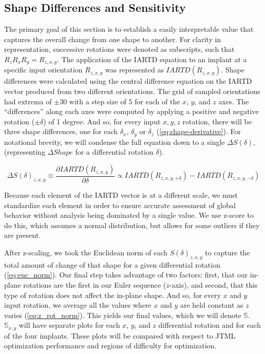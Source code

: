 \subsection{Shape Differences and Sensitivity}
The primary goal of this section is to establish a easily interpretable value that captures the overall change from one shape to another.
For clarity in representation, successive rotations were denoted as subscripts, such that $R_{z}R_{x}R_{y} = R_{z,x,y}$. The application of the IARTD equation to an implant at a specific input orientation $R_{z,x,y}$ was represented as $IARTD(R_{z,x,y})$.
Shape differences were calculated using the central difference equation on the IARTD vector produced from two different orientations.
The grid of sampled orientations had extrema of $\pm 30$ with a step size of $5$ for each of the $x$, $y$, and $z$ axes.
The ``differences'' along each axes were computed by applying a positive and negative rotation ($\pm \delta $) of 1 degree.
And so, for every input $x,y,z$ rotation, there will be three shape differences, one for each $\delta_{x}$, $\delta_{y}$ or $\delta_{z}$ (\cref{eq:shape-derivative}).
For notational brevity, we will condense the full equation down to a single $\Delta S(\delta)$, (representing $\Delta Shape$ for a differential rotation $\delta$).

\begin{equation}
	\label{eq:shape-derivative}
	\Delta S(\delta)_{z,x,y} \equiv \dfrac{ \partial IARTD(R_{z,x,y}) }{\partial \delta} \propto IARTD(R_{z,x,y,+\delta}) - IARTD(R_{z,x,y,-\delta})
\end{equation}

Because each element of the IARTD vector is at a different scale, we must standardize each element in order to ensure accurate assessment of global behavior without analysis being dominated by a single value.
We use z-score to do this, which assumes a normal distribution, but allows for some outliers if they are present.


After z-scaling, we took the Euclidean norm of each $S(\delta)_{z,x,y}$ to capture the total amount of change of that shape for a given differential rotation (\cref{eq:euc_norm}).
Our final step takes advantage of two factors: first, that our in-plane rotations are the first in our Euler sequence ($z$-axis), and second, that this type of rotation does not affect the in-plane shape.
And so, for every $x$ and $y$ input rotation, we average all the values where $x$ and $y$ are held constant as $z$ varies (\cref{eq:z_rot_norm}).
This yields our final values, which we will denote $\mathbb{S}$.
$\mathbb{S}_{x,y}$ will have separate plots for each $x$, $y$, and $z$ differential rotation and for each of the four implants.
These plots will be compared with respect to JTML optimization performance and regions of difficulty for optimization.


